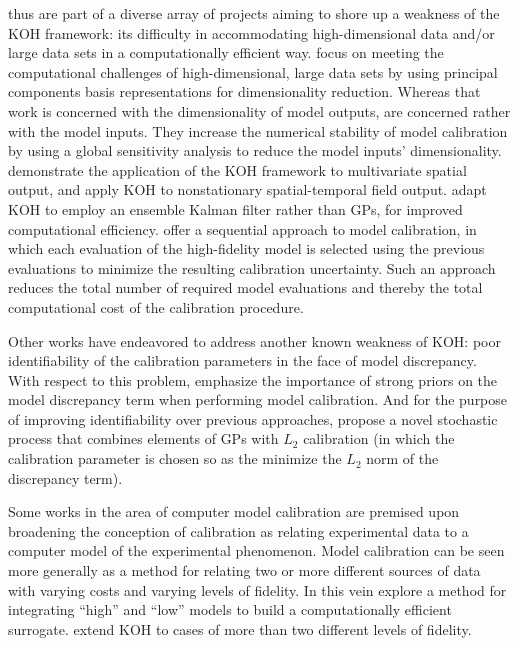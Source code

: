 \documentclass[10pt,a4paper]{article}
\begin{document}
\citet{Paulo2012} thus are part of a diverse array of projects aiming to shore up a weakness of the KOH framework: its difficulty in accommodating high-dimensional data and/or large data sets in a computationally efficient way.
\citet{Higdon2008a} focus on meeting the computational challenges of high-dimensional, large data sets by using principal components basis representations for dimensionality reduction.
Whereas that work is concerned with the dimensionality of model outputs, \citet{Drignei2012} are concerned rather with the model inputs.
They increase the numerical stability of model calibration by using a global sensitivity analysis to reduce the model inputs' dimensionality.
\citet{Bhat2010} demonstrate the application of the KOH framework to multivariate spatial output, and \citet{Pratola2013} apply KOH to nonstationary spatial-temporal field output.
\citet{Higdon2013} adapt KOH to employ an ensemble Kalman filter rather than GPs, for improved computational efficiency.
\citet{Yuan2013} offer a sequential approach to model calibration, in which each evaluation of the high-fidelity model is selected using the previous evaluations to minimize the resulting calibration uncertainty. 
Such an approach reduces the total number of required model evaluations and thereby the total computational cost of the calibration procedure.

Other works have endeavored to address another known weakness of KOH: poor identifiability of the calibration parameters in the face of model discrepancy.
With respect to this problem, \citet{Brynjarsdottir2014} emphasize the importance of strong priors on the model discrepancy term when performing model calibration.
And for the purpose of improving identifiability over previous approaches, \citet{Gu2018} propose a novel stochastic process that combines elements of GPs with $L_2$ calibration (in which the calibration parameter is chosen so as the minimize the $L_2$ norm of the discrepancy term).

Some works in the area of computer model calibration are premised upon broadening the conception of calibration as relating experimental data to a computer model of the experimental phenomenon.
Model calibration can be seen more generally as a method for relating two or more different sources of data with varying costs and varying levels of fidelity.
In this vein \citet{Qian2006} explore a method for integrating ``high'' and ``low'' models to build a computationally efficient surrogate.
\citet{Goh2013} extend KOH to cases of more than two different levels of fidelity.
\end{document}
